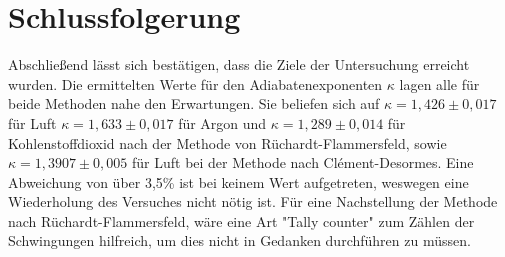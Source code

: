\section{Schlussfolgerung}

	Abschließend lässt sich bestätigen, dass die Ziele der Untersuchung erreicht wurden.
	Die ermittelten Werte für den Adiabatenexponenten $\kappa$ lagen alle für beide Methoden nahe den Erwartungen.
	Sie beliefen sich auf $\kappa = 1,426\pm 0,017$ für Luft $\kappa = 1,633\pm 0,017$ für Argon und $\kappa = 1,289\pm 0,014$ für Kohlenstoffdioxid nach der Methode von Rüchardt-Flammersfeld, sowie $\kappa = 1,3907\pm 0,005$ für Luft bei der Methode nach Clément-Desormes.
	Eine Abweichung von über 3,5\% ist bei keinem Wert aufgetreten, weswegen eine Wiederholung des Versuches nicht nötig ist.
	Für eine Nachstellung der Methode nach Rüchardt-Flammersfeld, wäre eine Art "Tally counter" zum Zählen der Schwingungen hilfreich, um dies nicht in Gedanken durchführen zu müssen.
	 